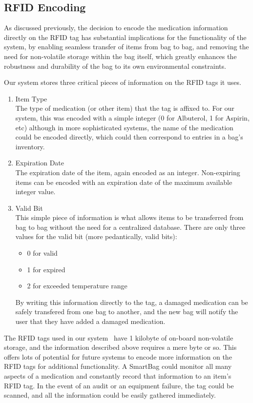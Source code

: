 \documentclass{sigchi}
\begin{document}
\subsection{RFID Encoding} \label{rfid}
As discussed previously, the decision to encode the medication information
directly on the RFID tag has substantial implications for the functionality
of the system, by enabling seamless transfer of items from bag to bag, and
removing the need for non-volatile storage within the bag itself, which greatly
enhances the robustness and durability of the bag to its own environmental
constraints.

Our system stores three critical pieces of information on the RFID tags it
uses.

\begin{enumerate}
\item Item Type\\
	The type of medication (or other item) that the tag is affixed to. For our
    system, this was encoded with a simple integer (0 for Albuterol, 1 for
    Aspirin, etc) although in more sophisticated systems, the name of the
    medication could be encoded directly, which could then correspond to
    entries in a bag's inventory.
\item Expiration Date\\
	The expiration date of the item, again encoded as an integer. Non-expiring
    items can be encoded with an expiration date of the maximum available
    integer value.
\item Valid Bit\\
	This simple piece of information is what allows items to be transferred
    from bag to bag without the need for a centralized database. There are only
    three values for the valid bit (more pedantically, valid bits):
    \begin{itemize}
    \item 0 for valid
    \item 1 for expired
    \item 2 for exceeded temperature range
    \end{itemize}
    By writing this information directly to the tag, a damaged medication can
    be safely transfered from one bag to another, and the new bag will notify
    the user that they have added a damaged medication.
\end{enumerate}

The RFID tags used in our system~\cite{rfid_tag} have 1 kilobyte of on-board
non-volatile storage, and the information described above requires a mere byte
or so. This offers lots of potential for future systems to encode more information
on the RFID tags for additional functionality. A SmartBag could monitor all many
aspects of a medication and constantly record that information to an item's RFID
tag. In the event of an audit or an equipment failure, the tag could be scanned,
and all the information could be easily gathered immediately.
\end{document}
